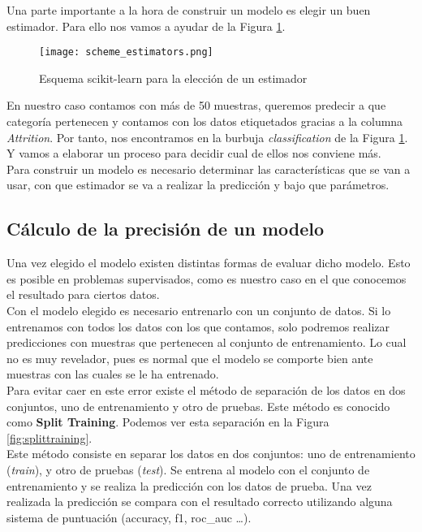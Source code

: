 Una parte importante a la hora de construir un modelo es elegir un buen estimador. Para ello nos vamos a ayudar de la Figura \ref{fig:scheme_estimators}.\\

\begin{figure}
	\centering
	\texttt{[image: scheme\_estimators.png]}
	\caption{Esquema scikit-learn para la elección de un estimador}
	\label{fig:scheme_estimators}
\end{figure}


En nuestro caso contamos con más de 50 muestras, queremos predecir a que categoría pertenecen y contamos con los datos etiquetados gracias a la columna \textit{Attrition}.
Por tanto, nos encontramos en la burbuja \textit{classification} de la Figura \ref{fig:scheme_estimators}.
Y vamos a elaborar un proceso para decidir cual de ellos nos conviene más.\\

Para construir un modelo es necesario determinar las características que se van a usar, con que estimador se va a realizar la predicción y bajo que parámetros.

\subsection{Cálculo de la precisión de un modelo}
Una vez elegido el modelo existen distintas formas de evaluar dicho modelo. Esto es posible en problemas supervisados, como es nuestro caso en el que conocemos el resultado para ciertos datos.\\

Con el modelo elegido es necesario entrenarlo con un conjunto de datos. Si lo entrenamos con todos los datos con los que contamos, solo podremos realizar predicciones con muestras que pertenecen al conjunto de entrenamiento. Lo cual no es muy revelador, pues es normal que el modelo se comporte bien ante muestras con las cuales se le ha entrenado.\\

Para evitar caer en este error existe el método de separación de los datos en dos conjuntos, uno de entrenamiento y otro de pruebas. Este método es conocido como \textbf{Split Training}. Podemos ver esta separación en la Figura \ref{fig:splittraining}.\\

Este método consiste en separar los datos en dos conjuntos: uno de entrenamiento (\textit{train}), y otro de pruebas (\textit{test}).	
Se entrena al modelo con el conjunto de entrenamiento y se realiza la predicción con los datos de prueba. Una vez realizada la predicción se compara con el resultado correcto utilizando alguna sistema de puntuación (accuracy, f1, roc\_auc \ldots).


